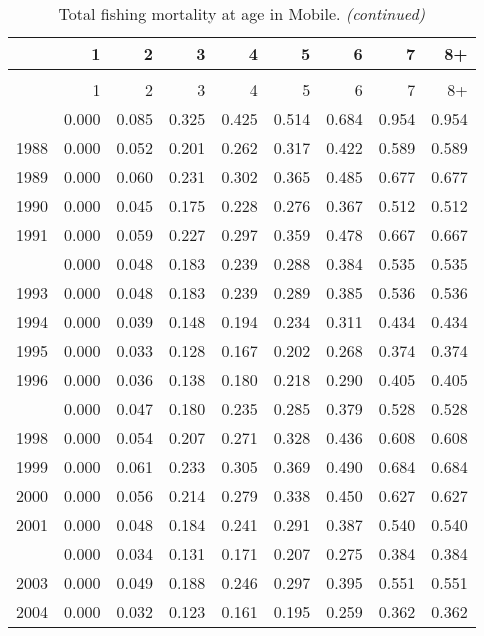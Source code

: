 \documentclass[
]{article}
\begin{document}
\begin{longtable}[t]{lrrrrrrrr}
\caption{\label{tab:Mobile-fleet-FAA-table}Total fishing mortality at age in Mobile.}\\
\toprule
  & 1 & 2 & 3 & 4 & 5 & 6 & 7 & 8+\\
\midrule
\endfirsthead
\caption[]{Total fishing mortality at age in Mobile. \textit{(continued)}}\\
\toprule
  & 1 & 2 & 3 & 4 & 5 & 6 & 7 & 8+\\
\midrule
\endhead

\endfoot
\bottomrule
\endlastfoot
1987 & 0.000 & 0.085 & 0.325 & 0.425 & 0.514 & 0.684 & 0.954 & 0.954\\
1988 & 0.000 & 0.052 & 0.201 & 0.262 & 0.317 & 0.422 & 0.589 & 0.589\\
1989 & 0.000 & 0.060 & 0.231 & 0.302 & 0.365 & 0.485 & 0.677 & 0.677\\
1990 & 0.000 & 0.045 & 0.175 & 0.228 & 0.276 & 0.367 & 0.512 & 0.512\\
1991 & 0.000 & 0.059 & 0.227 & 0.297 & 0.359 & 0.478 & 0.667 & 0.667\\
\addlinespace
1992 & 0.000 & 0.048 & 0.183 & 0.239 & 0.288 & 0.384 & 0.535 & 0.535\\
1993 & 0.000 & 0.048 & 0.183 & 0.239 & 0.289 & 0.385 & 0.536 & 0.536\\
1994 & 0.000 & 0.039 & 0.148 & 0.194 & 0.234 & 0.311 & 0.434 & 0.434\\
1995 & 0.000 & 0.033 & 0.128 & 0.167 & 0.202 & 0.268 & 0.374 & 0.374\\
1996 & 0.000 & 0.036 & 0.138 & 0.180 & 0.218 & 0.290 & 0.405 & 0.405\\
\addlinespace
1997 & 0.000 & 0.047 & 0.180 & 0.235 & 0.285 & 0.379 & 0.528 & 0.528\\
1998 & 0.000 & 0.054 & 0.207 & 0.271 & 0.328 & 0.436 & 0.608 & 0.608\\
1999 & 0.000 & 0.061 & 0.233 & 0.305 & 0.369 & 0.490 & 0.684 & 0.684\\
2000 & 0.000 & 0.056 & 0.214 & 0.279 & 0.338 & 0.450 & 0.627 & 0.627\\
2001 & 0.000 & 0.048 & 0.184 & 0.241 & 0.291 & 0.387 & 0.540 & 0.540\\
\addlinespace
2002 & 0.000 & 0.034 & 0.131 & 0.171 & 0.207 & 0.275 & 0.384 & 0.384\\
2003 & 0.000 & 0.049 & 0.188 & 0.246 & 0.297 & 0.395 & 0.551 & 0.551\\
2004 & 0.000 & 0.032 & 0.123 & 0.161 & 0.195 & 0.259 & 0.362 & 0.362\\

\end{longtable}
\end{document}
